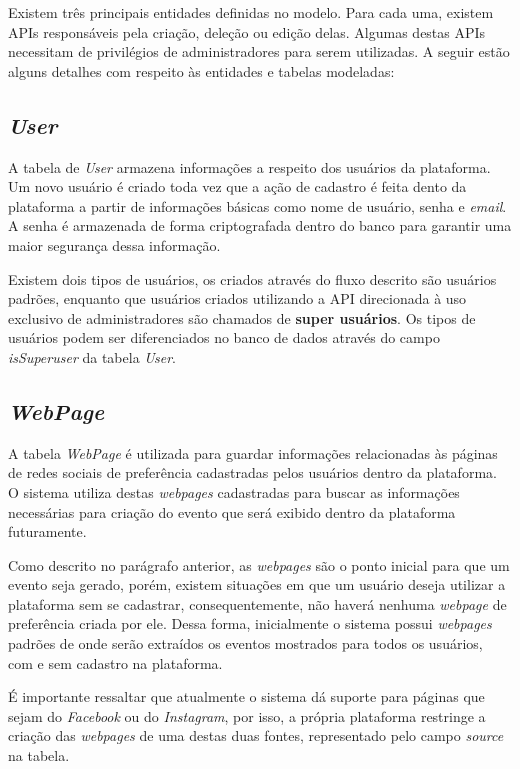 Existem três principais entidades definidas no modelo. Para cada uma, existem
\acp{API} responsáveis pela criação, deleção ou edição delas. Algumas destas
\acp{API} necessitam de privilégios de administradores para serem utilizadas. A
seguir estão alguns detalhes com respeito às entidades e tabelas modeladas:

\subsection{\textit{User}}

A tabela de \textit{User} armazena informações a respeito dos usuários da
plataforma. Um novo usuário é criado toda vez que a ação de cadastro é feita
dento da plataforma a partir de informações básicas como nome de usuário, senha
e \textit{email}. A senha é armazenada de forma criptografada dentro do banco
para garantir uma maior segurança dessa informação.

Existem dois tipos de usuários, os criados através do fluxo descrito são
usuários padrões, enquanto que usuários criados utilizando a \acs{API}
direcionada à uso exclusivo de administradores são chamados de \textbf{super
    usuários}. Os tipos de usuários podem ser diferenciados no banco de dados
através do campo \textit{isSuperuser} da tabela \textit{User}.

\subsection{\textit{WebPage}}

A tabela \textit{WebPage} é utilizada para guardar informações relacionadas às
páginas de redes sociais de preferência cadastradas pelos usuários dentro da
plataforma. O sistema utiliza destas \textit{webpages} cadastradas para buscar
as informações necessárias para criação do evento que será exibido dentro da
plataforma futuramente.

Como descrito no parágrafo anterior, as \textit{webpages} são o ponto inicial
para que um evento seja gerado, porém, existem situações em que um usuário
deseja utilizar a plataforma sem se cadastrar, consequentemente, não haverá
nenhuma \textit{webpage} de preferência criada por ele. Dessa forma,
inicialmente o sistema possui \textit{webpages} padrões de onde serão extraídos
os eventos mostrados para todos os usuários, com e sem cadastro na plataforma.

É importante ressaltar que atualmente o sistema dá suporte para páginas que sejam do \textit{Facebook} ou do \textit{Instagram}, por isso, a própria plataforma restringe a criação das \textit{webpages} de uma destas duas fontes, representado pelo campo \textit{source} na tabela.

